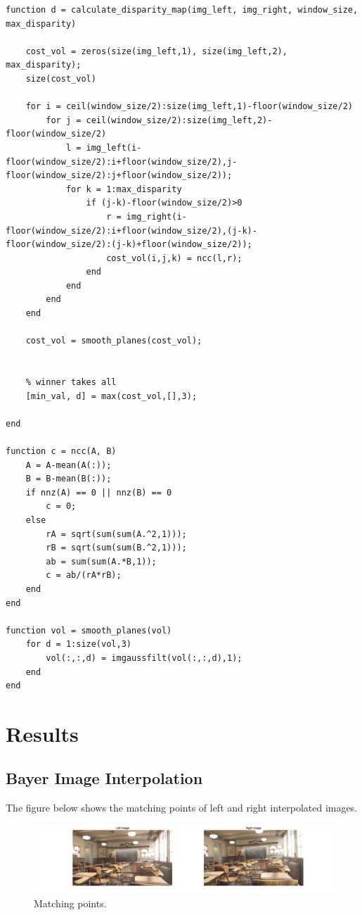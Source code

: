 \begin{lstlisting}[basicstyle=\ttfamily\tiny, style=Matlab-editor]
function d = calculate_disparity_map(img_left, img_right, window_size, max_disparity)
        
    cost_vol = zeros(size(img_left,1), size(img_left,2), max_disparity);
    size(cost_vol)
    
    for i = ceil(window_size/2):size(img_left,1)-floor(window_size/2)
        for j = ceil(window_size/2):size(img_left,2)-floor(window_size/2)
            l = img_left(i-floor(window_size/2):i+floor(window_size/2),j-floor(window_size/2):j+floor(window_size/2));
            for k = 1:max_disparity
                if (j-k)-floor(window_size/2)>0
                    r = img_right(i-floor(window_size/2):i+floor(window_size/2),(j-k)-floor(window_size/2):(j-k)+floor(window_size/2));
                    cost_vol(i,j,k) = ncc(l,r);
                end
            end
        end
    end
    
    cost_vol = smooth_planes(cost_vol);


    % winner takes all
    [min_val, d] = max(cost_vol,[],3);

end

function c = ncc(A, B)
    A = A-mean(A(:));
    B = B-mean(B(:));
    if nnz(A) == 0 || nnz(B) == 0
        c = 0;
    else
        rA = sqrt(sum(sum(A.^2,1)));
        rB = sqrt(sum(sum(B.^2,1)));
        ab = sum(sum(A.*B,1));
        c = ab/(rA*rB);
    end
end

function vol = smooth_planes(vol)
    for d = 1:size(vol,3)
        vol(:,:,d) = imgaussfilt(vol(:,:,d),1);
    end
end
\end{lstlisting}

\section*{Results}

\subsection{Bayer Image Interpolation}
The figure below shows the matching points of left and right interpolated images.

\begin{figure}[h]
	\centering
	\includegraphics[width=\textwidth]{../code/part1_result.png}
	\caption{Matching points.}
	\label{fig:matching_points}
\end{figure}

